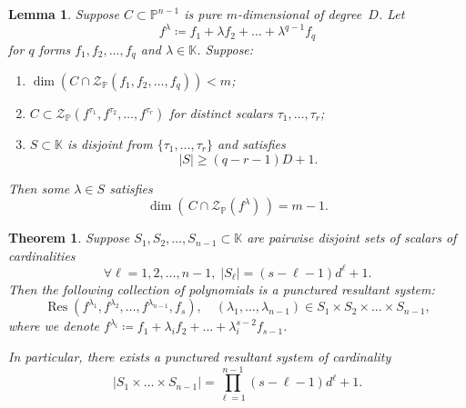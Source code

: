 \documentclass[10pt,a4paper]{amsart}
\newtheorem{lemma}{Lemma}
\newtheorem{theorem}{Theorem}
\newcommand{\KK}{\mathbb{K}}
\newcommand{\PP}{\mathbb{P}}
\DeclareMathOperator{\Res}{Res}
\newcommand{\cZ}{\mathcal{Z}}
\begin{document}
\begin{lemma}
\label{prop:dimension-drop}
    Suppose $C\subset\PP^{n-1}$ is pure $m$-dimensional of degree~$D$.
    Let \[
    f^\lambda \coloneqq f_1 + \lambda f_2 + \dots + \lambda^{q-1} f_q
    \] for $q$ forms $f_1,f_2,\dots,f_q$ and $\lambda\in\KK$.
    Suppose:
    \begin{enumerate}
        \item $\dim\left(C\cap\cZ_{\PP}(f_1,f_2,\dots,f_q)\right)<m$;
        \item $C\subset\cZ_{\PP}(f^{\tau_1},f^{\tau_2},\dots,f^{\tau_r})$ for distinct scalars $\tau_1,\dots,\tau_r$;
        \item $S\subset\KK$ is disjoint from $\{\tau_1,\dots,\tau_r\}$ and satisfies \[
        |S|\geq (q-r-1)D+1.
        \]
    \end{enumerate}
    Then some $\lambda\in S$ satisfies \[
    \dim\left(\, C\cap\cZ_{\PP}(f^\lambda) \,\right) = m-1.
    \]
\end{lemma}

\begin{theorem}
\label{thm:explicit-multivariate}
Suppose $S_1,S_2,\dots,S_{n-1}\subset\KK$ are pairwise disjoint sets of scalars of cardinalities \[
\forall \ell=1,2,\dots,n-1, \; |S_{\ell}| = (s-\ell-1)d^{\ell}+1.
\] Then the following collection of polynomials is a punctured resultant system: \begin{equation}
\label{eq:explicit-system-multi}
\Res(f^{\lambda_1}, f^{\lambda_2},\dots, f^{\lambda_{n-1}}, f_s),\quad (\lambda_1,\dots,\lambda_{n-1})\in S_1 \times S_2\times\dots\times S_{n-1},
\end{equation} where we denote $f^{\lambda_i}\coloneqq f_1 + \lambda_i f_2 +\dots + \lambda_i^{s-2} f_{s-1}$.

In particular, there exists a punctured resultant system of cardinality \[
|S_1\times\dots\times S_{n-1}| = \prod_{\ell=1}^{n-1} (s-\ell-1) d^{\ell} + 1.
\] 
\end{theorem}
\end{document}
